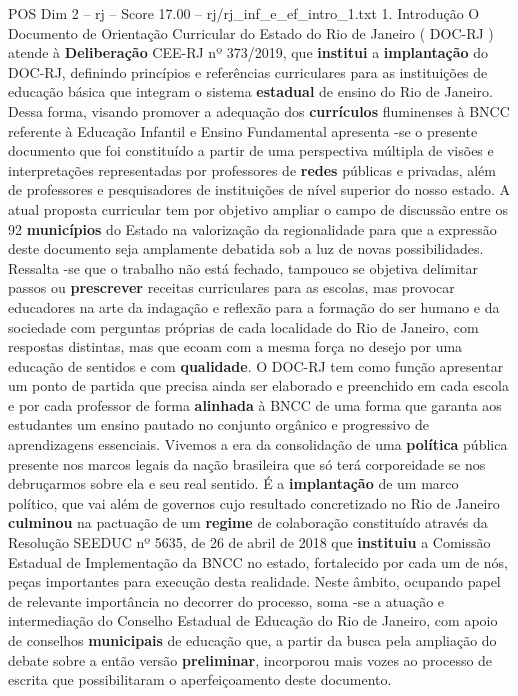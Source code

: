 \begin{textsample}{POS Dim 2 – rj – Score 17.00 – rj/rj\_inf\_e\_ef\_intro\_1.txt}  \label{ex:f2_pos_234}
1.
Introdução O Documento de Orientação Curricular do Estado do Rio de Janeiro ( DOC-RJ ) atende à \textbf{Deliberação} CEE-RJ nº 373/2019, que \textbf{institui} a \textbf{implantação} do DOC-RJ, definindo princípios e referências curriculares para as instituições de educação básica que integram o sistema \textbf{estadual} de ensino do Rio de Janeiro.
Dessa forma, visando promover a adequação dos \textbf{currículos} fluminenses à BNCC referente à Educação Infantil e Ensino Fundamental apresenta -se o presente documento que foi constituído a partir de uma perspectiva múltipla de visões e interpretações representadas por professores de \textbf{redes} públicas e privadas, além de professores e pesquisadores de instituições de nível superior do nosso estado.
A atual proposta curricular tem por objetivo ampliar o campo de discussão entre os 92 \textbf{municípios} do Estado na valorização da regionalidade para que a expressão deste documento seja amplamente debatida sob a luz de novas possibilidades.
Ressalta -se que o trabalho não está fechado, tampouco se objetiva delimitar passos ou \textbf{prescrever} receitas curriculares para as escolas, mas provocar educadores na arte da indagação e reflexão para a formação do ser humano e da sociedade com perguntas próprias de cada localidade do Rio de Janeiro, com respostas distintas, mas que ecoam com a mesma força no desejo por uma educação de sentidos e com \textbf{qualidade}.
O DOC-RJ tem como função apresentar um ponto de partida que precisa ainda ser elaborado e preenchido em cada escola e por cada professor de forma \textbf{alinhada} à BNCC de uma forma que garanta aos estudantes um ensino pautado no conjunto orgânico e progressivo de aprendizagens essenciais.
Vivemos a era da consolidação de uma \textbf{política} pública presente nos marcos legais da nação brasileira que só terá corporeidade se nos debruçarmos sobre ela e seu real sentido.
É a \textbf{implantação} de um marco político, que vai além de governos cujo resultado concretizado no Rio de Janeiro \textbf{culminou} na pactuação de um \textbf{regime} de colaboração constituído através da Resolução SEEDUC nº 5635, de 26 de abril de 2018 que \textbf{instituiu} a Comissão Estadual de Implementação da BNCC no estado, fortalecido por cada um de nós, peças importantes para execução desta realidade.
Neste âmbito, ocupando papel de relevante importância no decorrer do processo, soma -se a atuação e intermediação do Conselho Estadual de Educação do Rio de Janeiro, com apoio de conselhos \textbf{municipais} de educação que, a partir da busca pela ampliação do debate sobre a então versão \textbf{preliminar}, incorporou mais vozes ao processo de escrita que possibilitaram o aperfeiçoamento deste documento.

\end{textsample}
